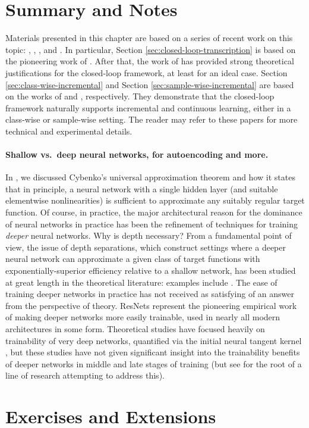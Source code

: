 \documentclass[\toplevelprefix/book-main.tex]{subfiles}
\begin{document}
\section{Summary and Notes}
Materials presented in this chapter are based on a series of recent work on this topic: \cite{Dai-entropy-2022}, 
\cite{pai2022pursuit}, \cite{tong2023incremental}, and \cite{pmlr-v234-tong24a}. In particular, Section \ref{sec:closed-loop-transcription} is based on the pioneering work of \cite{Dai-entropy-2022}. After that, the work of \cite{pai2022pursuit} has provided strong theoretical justifications for the closed-loop framework, at least for an ideal case. Section \ref{sec:class-wise-incremental} and Section \ref{sec:sample-wise-incremental} are based on the works of \cite{tong2023incremental} and \cite{pmlr-v234-tong24a}, respectively. They demonstrate that the closed-loop framework naturally supports incremental and continuous learning, either in a class-wise or sample-wise setting. The reader may refer to these papers for more technical and experimental details.


\paragraph{Shallow vs.\ deep neural networks, for autoencoding and more.}
In , we discussed Cybenko's universal approximation
theorem and how it states that in principle, a neural network with a single
hidden layer (and suitable elementwise nonlinearities) is sufficient to
approximate any suitably regular target function. Of course, in practice, the
major architectural reason for the dominance of neural networks in practice has
been the refinement of techniques for training \textit{deeper} neural networks.
Why is depth necessary?
From a fundamental point of view, the issue of depth separations, which
construct settings where a deeper neural network can approximate a given class
of target functions with exponentially-superior efficiency relative to a shallow
network,
has been studied at great length in the theoretical literature:
examples include \cite{Telgarsky2016-sn,Bresler2020-xy,Venturi2021-qc}. 
The ease of training deeper
networks in practice has not received as satisfying of an answer from the
perspective of theory. 
ResNets \cite{he2016deep} represent the pioneering empirical work of
making deeper networks more easily trainable, used in nearly all modern
architectures in some form. Theoretical studies have focused heavily on
trainability of very deep networks, quantified via the initial neural tangent
kernel \cite{Buchanan2021-sj,Martens2021-cx}, but these studies have not given
significant insight into the trainability benefits of deeper networks in middle
and late stages of training (but see \cite{Yang2021-gw} for the root of a line
of research attempting to address this).

\section{Exercises and Extensions}
\end{document}
